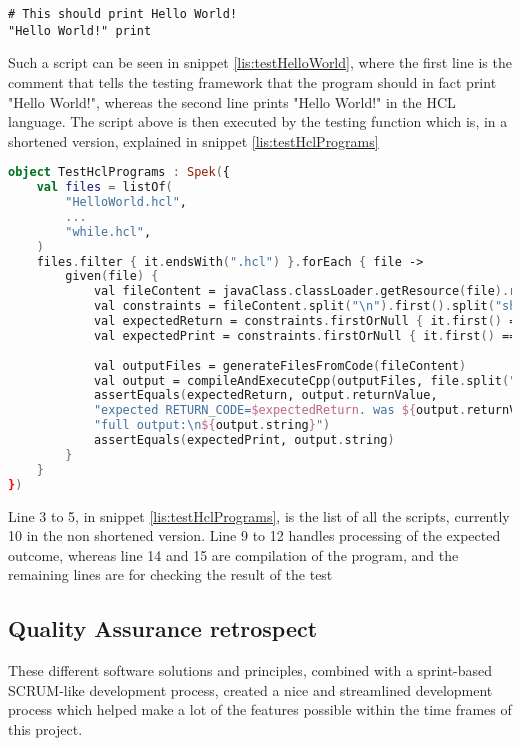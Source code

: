 \begin{lstlisting}[language=HCL,label=lis:testHelloWorld,firstnumber=1,caption={A HCL test-script as part of the testing framework}]
# This should print Hello World!
"Hello World!" print
\end{lstlisting}
Such a script can be seen in snippet \ref{lis:testHelloWorld}, where the first line is the comment that tells the testing framework that the program should in fact print "Hello World!", whereas the second line prints "Hello World!" in the HCL language.
The script above is then executed by the testing function which is, in a shortened version, explained in snippet \ref{lis:testHclPrograms}
\begin{lstlisting}[language=Kotlin,label={lis:testHclPrograms},caption={Shortened version of the test for system tests}]
object TestHclPrograms : Spek({
	val files = listOf(
		"HelloWorld.hcl",
		...
		"while.hcl",
	)
	files.filter { it.endsWith(".hcl") }.forEach { file ->
		given(file) {
			val fileContent = javaClass.classLoader.getResource(file).readText()
			val constraints = fileContent.split("\n").first().split("should 		").drop(1).map { it.split(" ") }
			val expectedReturn = constraints.firstOrNull { it.first() == "return" }?.get(1)?.toInt() ?: 0
			val expectedPrint = constraints.firstOrNull { it.first() == "print" }?.drop(1)?.joinToString(" ") ?: " "
			
			val outputFiles = generateFilesFromCode(fileContent)
			val output = compileAndExecuteCpp(outputFiles, file.split(".").first(), keepFiles)!!
			assertEquals(expectedReturn, output.returnValue,
			"expected RETURN_CODE=$expectedReturn. was ${output.returnValue}.\n" +
			"full output:\n${output.string}")
			assertEquals(expectedPrint, output.string)	
		}
	}
})
\end{lstlisting}

Line 3 to 5, in snippet \ref{lis:testHclPrograms}, is the list of all the scripts, currently 10 in the non shortened version. 
Line 9 to 12 handles processing of the expected outcome, whereas line 14 and 15 are compilation of the program, and the remaining lines are for checking the result of the test

\subsection{Quality Assurance retrospect}

These different software solutions and principles, combined with a sprint-based SCRUM-like development process, created a nice and streamlined development process which helped make a lot of the features possible within the time frames of this project.